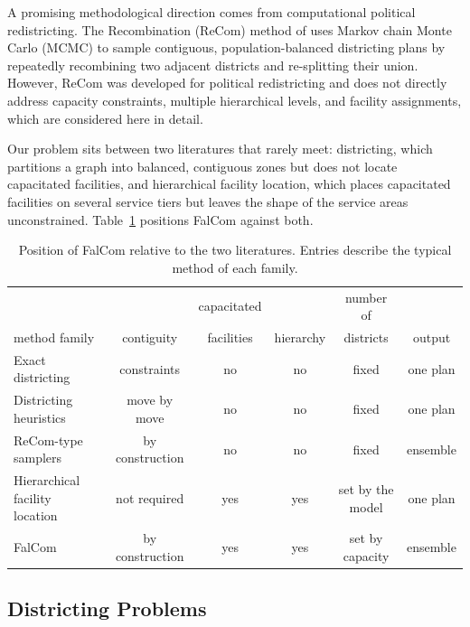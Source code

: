 \documentclass[11pt]{article}
\theoremstyle{definition}
\begin{document}
A promising methodological direction comes from computational political redistricting. 
The Recombination (ReCom) method of \citet{deford2021recombination} uses 
Markov chain Monte Carlo (MCMC) to sample contiguous, population-balanced districting 
plans by repeatedly recombining two adjacent districts and re-splitting their union. 
However, ReCom was developed for political redistricting and does not directly address 
capacity constraints, multiple hierarchical levels, and facility assignments, 
which are considered here in detail.

Our problem sits between two literatures that rarely meet: districting, which partitions a graph into balanced, contiguous zones but does not locate capacitated facilities, and hierarchical facility location, which places capacitated facilities on several service tiers but leaves the shape of the service areas unconstrained. Table~\ref{tab:positioning} positions FalCom against both.

\begin{table}[!htb]
\centering
\small
\begin{tabular}{lccccc}
\toprule
 & & capacitated & & number of & \\
method family & contiguity & facilities & hierarchy & districts & output \\
\midrule
Exact districting~\citep{validi2022imposing} & constraints & no & no & fixed & one plan \\
Districting heuristics~\citep{ricca2013political} & move by move & no & no & fixed & one plan \\
ReCom-type samplers~\citep{deford2021recombination} & by construction & no & no & fixed & ensemble \\
Hierarchical facility location~\citep{contreras2020hierarchical} & not required & yes & yes & set by the model & one plan \\
FalCom & by construction & yes & yes & set by capacity & ensemble \\
\bottomrule
\end{tabular}
\caption{Position of FalCom relative to the two literatures. Entries describe the typical method of each family.}
\label{tab:positioning}
\end{table}

\subsection{Districting Problems}
\label{sec:lit-districting}
\end{document}
